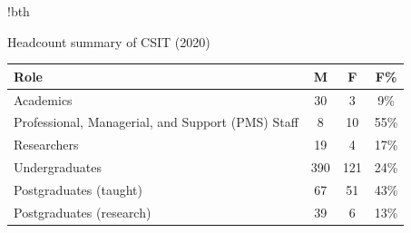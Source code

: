\begin{tabbox}[11cm]{!bth}

\caption[Headcount summary of CSIT]{Headcount summary of CSIT (2020)
}
\label{tab:headcount}
\footnotesize   
\begin{tabular}{p{8cm} 
                S[table-format=3.0]
                !{\qquad}
                S[table-format=2.0]
                !{\qquad}
                S[table-format=2.0\%]} 

\toprule 
Role & {M} & {F} & {F\%} \\
\midrule 
Academics & 30 & 3 & 9\%\\
\hdashline
Professional, Managerial, and Support (PMS) Staff & 8 & 10 & 55\%\\
\hdashline
Researchers & 19 & 4 & 17\%\\
\hdashline
Undergraduates & 390 & 121 & 24\%\\
\hdashline
Postgraduates (taught) & 67 & 51 & 43\%\\
\hdashline
Postgraduates (research) & 39 & 6 & 13\%\\

\bottomrule 
\end{tabular}

\end{tabbox}
